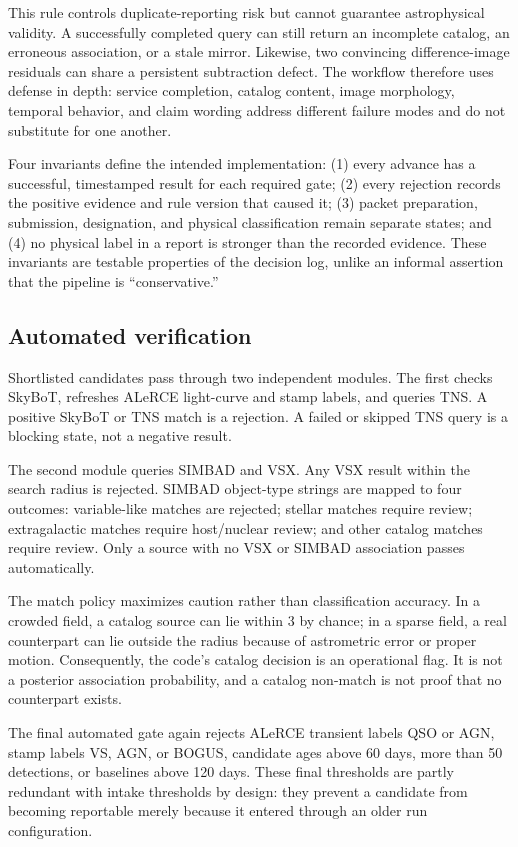 \documentclass[11pt]{article}
\begin{document}
This rule controls duplicate-reporting risk but cannot guarantee astrophysical validity. A successfully completed query can still return an incomplete catalog, an erroneous association, or a stale mirror. Likewise, two convincing difference-image residuals can share a persistent subtraction defect. The workflow therefore uses defense in depth: service completion, catalog content, image morphology, temporal behavior, and claim wording address different failure modes and do not substitute for one another.

Four invariants define the intended implementation: (1) every advance has a successful, timestamped result for each required gate; (2) every rejection records the positive evidence and rule version that caused it; (3) packet preparation, submission, designation, and physical classification remain separate states; and (4) no physical label in a report is stronger than the recorded evidence. These invariants are testable properties of the decision log, unlike an informal assertion that the pipeline is ``conservative.''

\subsection{Automated verification}

Shortlisted candidates pass through two independent modules. The first checks SkyBoT, refreshes ALeRCE light-curve and stamp labels, and queries TNS. A positive SkyBoT or TNS match is a rejection. A failed or skipped TNS query is a blocking state, not a negative result.

The second module queries SIMBAD and VSX. Any VSX result within the search radius is rejected. SIMBAD object-type strings are mapped to four outcomes: variable-like matches are rejected; stellar matches require review; extragalactic matches require host/nuclear review; and other catalog matches require review. Only a source with no VSX or SIMBAD association passes automatically.

The match policy maximizes caution rather than classification accuracy. In a crowded field, a catalog source can lie within \SI{3}{\arcsec} by chance; in a sparse field, a real counterpart can lie outside the radius because of astrometric error or proper motion. Consequently, the code's catalog decision is an operational flag. It is not a posterior association probability, and a catalog non-match is not proof that no counterpart exists.

The final automated gate again rejects ALeRCE transient labels QSO or AGN, stamp labels VS, AGN, or BOGUS, candidate ages above 60 days, more than 50 detections, or baselines above 120 days. These final thresholds are partly redundant with intake thresholds by design: they prevent a candidate from becoming reportable merely because it entered through an older run configuration.
\end{document}
